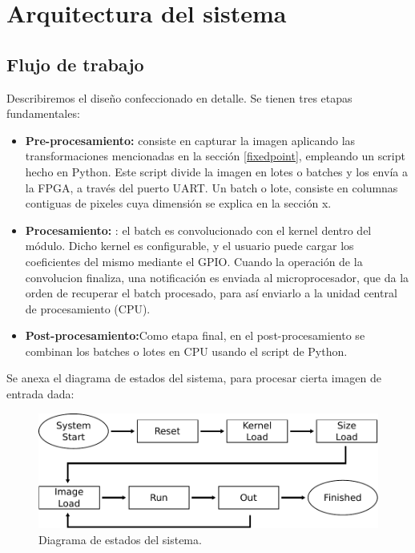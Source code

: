 \documentclass[a4paper]{article}
\begin{document}
\section{Arquitectura del sistema}
\subsection{Flujo de trabajo}

Describiremos el diseño confeccionado en detalle. Se tienen tres etapas fundamentales:


\begin{frame}{}

    
      \begin{itemize}
        \item \textbf{Pre-procesamiento:} consiste en capturar la imagen aplicando las transformaciones mencionadas en la sección \ref{fixedpoint}, empleando un script hecho en Python. Este script divide la imagen en lotes o batches y los envía a la FPGA, a través del puerto UART. Un batch o lote, consiste en columnas contiguas de pixeles cuya dimensión se explica en la sección x.
        \item \textbf{Procesamiento:}	: el batch es convolucionado con el kernel dentro del módulo. Dicho kernel es configurable, y el usuario puede cargar los coeficientes del mismo mediante el GPIO. 
Cuando la operación de la convolucion finaliza, una notificación es enviada al microprocesador, que da la orden de recuperar el batch procesado, para así enviarlo a la unidad central de procesamiento (CPU).
       \item \textbf{Post-procesamiento:}Como etapa final, en el post-procesamiento se combinan los batches o lotes en CPU usando el script de Python.
      \end{itemize}
     
\end{frame}


Se anexa el diagrama de estados del sistema, para procesar cierta imagen de entrada dada:\\

\begin{figure}[H]
\centering
\includegraphics[scale=0.7]{states.pdf}
\caption{Diagrama de estados del sistema.}
\label{statesfig}
\end{figure}
\end{document}
